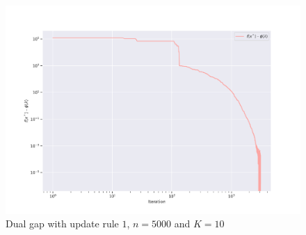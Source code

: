 \documentclass[notitlepage]{article}
\begin{document}


\hspace{0pt}
\vfill

\begin{minipage}{.7\textwidth}
  \begin{figure}[H]
    \centering
    \includegraphics[scale=0.5]{pics/n=5000_K=10_gap_rule=1.png}
    \caption{Dual gap with update rule $1$, $n=5000$ and $K=10$}
    \label{fig:rule-1-n-5000-k-10-gap}
  \end{figure}
\end{minipage}
\begin{minipage}{.3\textwidth}
  \begin{table}[H]
    \centering
    \caption{\centering Sum up table}
    \label{tab:n-5000-K-10-rule-1}
  \end{table}
\end{minipage}
\end{document}
